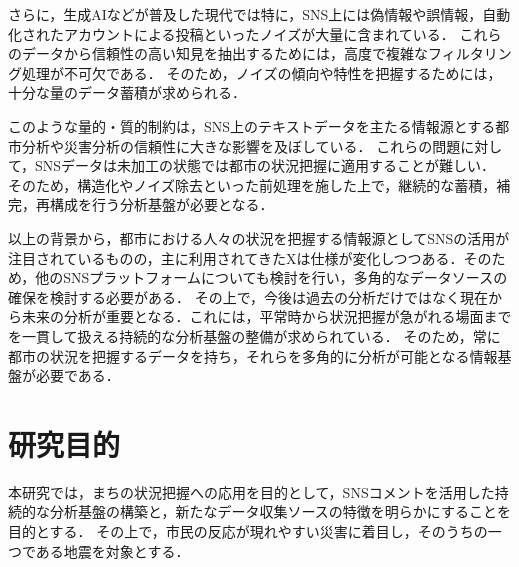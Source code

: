 さらに，生成AIなどが普及した現代では特に，SNS上には偽情報や誤情報，自動化されたアカウントによる投稿といったノイズが大量に含まれている．
これらのデータから信頼性の高い知見を抽出するためには，高度で複雑なフィルタリング処理が不可欠である．
そのため，ノイズの傾向や特性を把握するためには，十分な量のデータ蓄積が求められる．

このような量的・質的制約は，SNS上のテキストデータを主たる情報源とする都市分析や災害分析の信頼性に大きな影響を及ぼしている．
これらの問題に対して，SNSデータは未加工の状態では都市の状況把握に適用することが難しい．
そのため，構造化やノイズ除去といった前処理を施した上で，継続的な蓄積，補完，再構成を行う分析基盤が必要となる．

以上の背景から，都市における人々の状況を把握する情報源としてSNSの活用が注目されているものの，主に利用されてきたXは仕様が変化しつつある．そのため，他のSNSプラットフォームについても検討を行い，多角的なデータソースの確保を検討する必要がある．
その上で，今後は過去の分析だけではなく現在から未来の分析が重要となる．これには，平常時から状況把握が急がれる場面までを一貫して扱える持続的な分析基盤の整備が求められている．
そのため，常に都市の状況を把握するデータを持ち，それらを多角的に分析が可能となる情報基盤が必要である．




\section{研究目的}
本研究では，まちの状況把握への応用を目的として，SNSコメントを活用した持続的な分析基盤の構築と，新たなデータ収集ソースの特徴を明らかにすることを目的とする．
その上で，市民の反応が現れやすい災害に着目し，そのうちの一つである地震を対象とする．

